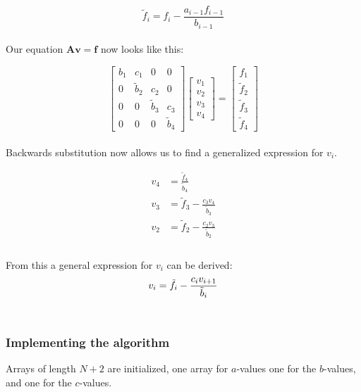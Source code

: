 \documentclass[12pt]{article}
\begin{document}
\begin{equation}\label{eq:f-el}
\tilde{f}_i = f_i -\frac{a_{i-1}f_{i-1}}{b_{i-1}}
\end{equation} \\

\noindent Our equation $\mathbf{Av = f}$ now looks like this:

\[
\begin{bmatrix}
b_1 & c_1 & 0 & 0 \\ 0 & \tilde{b}_2 & c_2 & 0 \\ 0 & 0 & \tilde{b}_3 & c_3 \\ 0 & 0 & 0 & \tilde{b}_4
\end{bmatrix}
\begin{bmatrix}
v_1 \\ v_2 \\ v_3 \\ v_4
\end{bmatrix} =
\begin{bmatrix}
f_1 \\ \tilde{f}_2 \\ \tilde{f}_3 \\ \tilde{f}_4
\end{bmatrix}
\]\\

\noindent Backwards substitution now allows us to find a generalized expression for $v_i$.

\begin{align*}
v_4 &= \frac{\tilde{f}_4}{\tilde{b}_4} \\
v_3 &= \tilde{f}_3 - \frac{c_3v_4}{\tilde{b}_3} \\
v_2 &= \tilde{f}_2 - \frac{c_2v_3}{\tilde{b}_2} \\
\end{align*} \\

\noindent  From this a general expression for $v_i$ can be derived:
\begin{equation}\label{eq:ui-general}
v_i = \tilde{f}_i - \frac{c_iv_{i+1}}{\tilde{b}_i} \\
\end{equation} \\

\subsubsection{Implementing the algorithm}
Arrays of length $N+2$ are initialized, one array for $a$-values one for the $b$-values, and one for the $c$-values. \\
\end{document}
